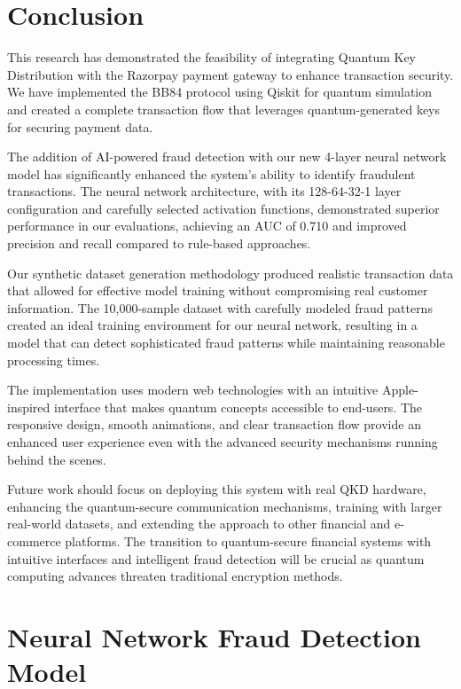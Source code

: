 \documentclass[onecolumn,a4paper,10pt]{IEEEtran}
\begin{document}
\section{Conclusion}
\setcounter{figure}{0}
\setcounter{table}{0}

This research has demonstrated the feasibility of integrating Quantum Key Distribution with the Razorpay payment gateway to enhance transaction security. We have implemented the BB84 protocol using Qiskit for quantum simulation and created a complete transaction flow that leverages quantum-generated keys for securing payment data. 

The addition of AI-powered fraud detection with our new 4-layer neural network model has significantly enhanced the system's ability to identify fraudulent transactions. The neural network architecture, with its 128-64-32-1 layer configuration and carefully selected activation functions, demonstrated superior performance in our evaluations, achieving an AUC of 0.710 and improved precision and recall compared to rule-based approaches.

Our synthetic dataset generation methodology produced realistic transaction data that allowed for effective model training without compromising real customer information. The 10,000-sample dataset with carefully modeled fraud patterns created an ideal training environment for our neural network, resulting in a model that can detect sophisticated fraud patterns while maintaining reasonable processing times.

The implementation uses modern web technologies with an intuitive Apple-inspired interface that makes quantum concepts accessible to end-users. The responsive design, smooth animations, and clear transaction flow provide an enhanced user experience even with the advanced security mechanisms running behind the scenes.

Future work should focus on deploying this system with real QKD hardware, enhancing the quantum-secure communication mechanisms, training with larger real-world datasets, and extending the approach to other financial and e-commerce platforms. The transition to quantum-secure financial systems with intuitive interfaces and intelligent fraud detection will be crucial as quantum computing advances threaten traditional encryption methods.

\section{Neural Network Fraud Detection Model}
\setcounter{figure}{0}
\setcounter{table}{0}
\end{document}

